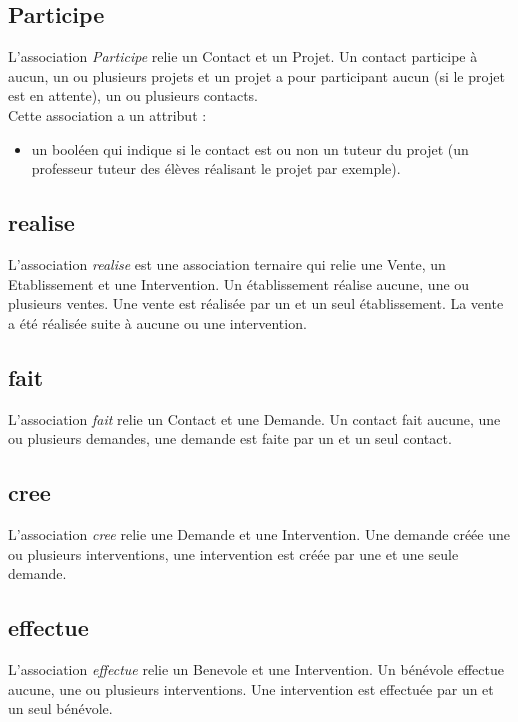 \documentclass[asi, sansVersion]{picInsa}
\begin{document}
\subsection*{Participe}
L'association \textit{Participe} relie un Contact et un Projet. Un contact participe à aucun, un ou plusieurs projets et un projet a pour participant aucun (si le projet est en attente), un ou plusieurs contacts.\\
Cette association a un attribut :
\begin{itemize}
\item un booléen qui indique si le contact est ou non un tuteur du projet (un professeur tuteur des élèves réalisant le projet par exemple). 
\end{itemize}

\subsection*{realise}

L'association \textit{realise} est une association ternaire qui relie une Vente, un Etablissement et une Intervention. Un établissement réalise aucune, une ou plusieurs ventes. Une vente est réalisée par un et un seul établissement. La vente a été réalisée suite à aucune ou une intervention.

\subsection*{fait}

L'association \textit{fait} relie un Contact et une Demande. Un contact fait aucune, une ou plusieurs demandes, une demande est faite par un et un seul contact.

\subsection*{cree}

L'association \textit{cree} relie une Demande et une Intervention. Une demande créée une ou plusieurs interventions, une intervention est créée par une et une seule demande.

\subsection*{effectue} 

L'association \textit{effectue} relie un Benevole et une Intervention. Un bénévole effectue aucune, une ou plusieurs interventions. Une intervention est effectuée par un et un seul bénévole. 
\end{document}
